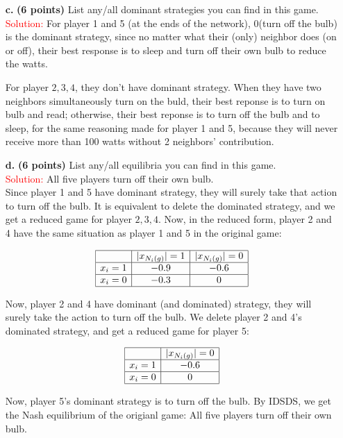 \documentclass[11pt]{article} %
\begin{document}
\begin{itemize}
\item[\textbf{c.}] \textbf{(6 points)}  List any/all  dominant strategies you can find in this game.\\

\textcolor{red}{Solution:}
For player 1 and 5 (at the ends of the network), 0(turn off the bulb) is the dominant strategy, since no matter what their (only) neighbor does (on or off), their best response is to sleep and turn off their own bulb to reduce the watts.

For player ${2,3,4}$, they don't have dominant strategy. When they have two neighbors simultaneously turn on the buld, their best reponse is to turn on bulb and read; otherwise, their best reponse is to turn off the bulb and to sleep, for the same reasoning made for player 1 and 5, because they will never receive more than 100 watts without 2 neighbors' contribution. 


\item[\textbf{d.}] \textbf{(6 points)}   List any/all equilibria you can find in this game.\\

\textcolor{red}{Solution:} All five players turn off their own bulb.\\

Since player 1 and 5 have dominant strategy, they will surely take that action to turn off the bulb. It is equivalent to delete the dominated strategy, and we get a reduced game for player ${2,3,4}$. Now, in the reduced form, player 2 and 4 have the same situation as player 1 and 5 in the original game:

$$\begin{array} {|c|c|c|c|} \hline
& \text{$|x_{N_i(g)}|=1$} & \text{$|x_{N_i(g)}|=0$}\\ \hline
\text{$x_i=1$} & -0.9 & -0.6   \\ \hline
\text{$x_i=0$} & -0.3 & 0   \\ \hline
\end{array}$$	

Now, player 2 and 4 have dominant (and dominated) strategy, they will surely take the action to turn off the bulb. We delete player 2 and 4's dominated strategy, and get a reduced game for player 5: 

$$\begin{array} {|c|c|c|c|} \hline
 & \text{$|x_{N_i(g)}|=0$}\\ \hline
\text{$x_i=1$} & -0.6   \\ \hline
\text{$x_i=0$} & 0   \\ \hline
\end{array}$$	

Now, player 5's dominant strategy is to turn off the bulb. By IDSDS, we get the Nash equilibrium of the origianl game: All five players turn off their own bulb.

\end{itemize}
\end{document}
